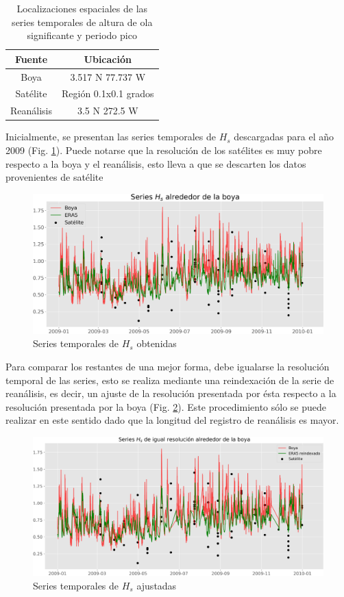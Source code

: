 \documentclass[5p,times,authoryear]{elsarticle}
\begin{document}
\begin{table}[h]
    \centering
    \begin{tabular}{c|c}
         \bf{Fuente} & \bf{Ubicación}\\
         \hline
         Boya & 3.517 N 77.737 W \\
         \hline
         Satélite & Región 0.1x0.1 grados\\
         \hline
         Reanálisis & 3.5 N 272.5 W \\
    \end{tabular}
    \caption{Localizaciones espaciales de las series temporales de altura de ola significante y periodo pico}
    \label{tab:ubic espaciales}
\end{table}

Inicialmente, se presentan las series temporales de $H_s$ descargadas para el año 2009 (Fig. \ref{fig:1}). Puede notarse que la resolución de los satélites es muy pobre respecto a la boya y el reanálisis, esto lleva a que se descarten los datos provenientes de satélite

\begin{figure}[h]
    \centering
    \includegraphics[scale=0.28]{Graficas/Serie1}
    \caption{Series temporales de $H_s$ obtenidas}
    \label{fig:1}
\end{figure}

Para comparar los restantes de una mejor forma, debe igualarse la resolución temporal de las series, esto se realiza mediante una reindexación de la serie de reanálisis, es decir, un ajuste de la resolución presentada por ésta respecto a la resolución presentada por la boya (Fig. \ref{fig:2}). Este procedimiento sólo se puede realizar en este sentido dado que la longitud del registro de reanálisis es mayor.

\begin{figure}
    \centering
    \includegraphics[scale=0.28]{Graficas/Serie2}
    \caption{Series temporales de $H_s$ ajustadas}
    \label{fig:2}
\end{figure}
\end{document}
